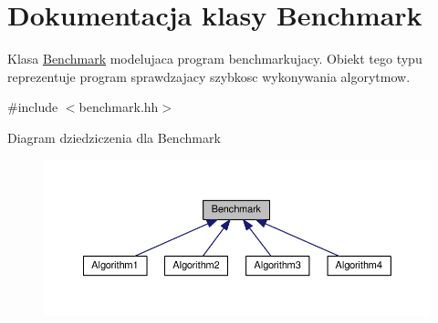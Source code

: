 \hypertarget{class_benchmark}{\section{Dokumentacja klasy Benchmark}
\label{class_benchmark}
}


Klasa \hyperlink{class_benchmark}{Benchmark} modelujaca program benchmarkujacy. Obiekt tego typu reprezentuje program sprawdzajacy szybkosc wykonywania algorytmow.  




{\ttfamily \#include $<$benchmark.\-hh$>$}



Diagram dziedziczenia dla Benchmark\nopagebreak
\begin{figure}[H]
\begin{center}
\leavevmode
\includegraphics[width=350pt]{class_benchmark__inherit__graph}
\end{center}
\end{figure}
